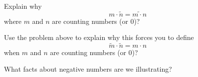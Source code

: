 \begin{prob}
Explain why 
\[
m\cdot\tilde{n} = \tilde{m\cdot n}
\]
 where $m$ and $n$ are counting numbers (or $0$)?
\end{prob}


\begin{prob}
Use the problem above to explain why this forces you to define
\[
\tilde{m}\cdot \tilde{n} = m\cdot n 
\]
when $m$ and $n$ are counting numbers (or $0$)?
\end{prob}

\begin{prob}
What facts about negative numbers are we illustrating?
\end{prob}
